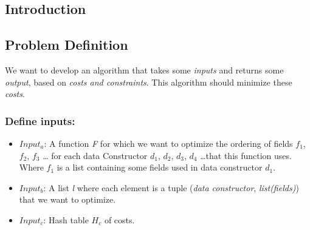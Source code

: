 


\subsection{Introduction}


\subsection{Problem Definition}

We want to develop an algorithm that takes some \textit{inputs} and returns some \textit{output}, based on \textit{costs and constraints}.
This algorithm should minimize these \textit{costs}.   

\subsubsection{Define inputs: }

\begin{itemize}
  \item $Input_a$: A function \textit{F} for which we want to optimize the ordering of fields $f_1$, $f_2$, $f_3$ \dots
                   for each data Constructor $d_1$, $d_2$, $d_3$, $d_4$ \dots that this function uses. Where $f_1$ is a list containing some fields used in 
                   data constructor $d_1$. 

  \item $Input_b$: A list \textit{l} where each element is a tuple (\textit{data constructor}, \textit{list(fields)}) that we 
                   want to optimize. 
                   
  \item $Input_c$: Hash table $H_c$ of costs.
\end{itemize}

